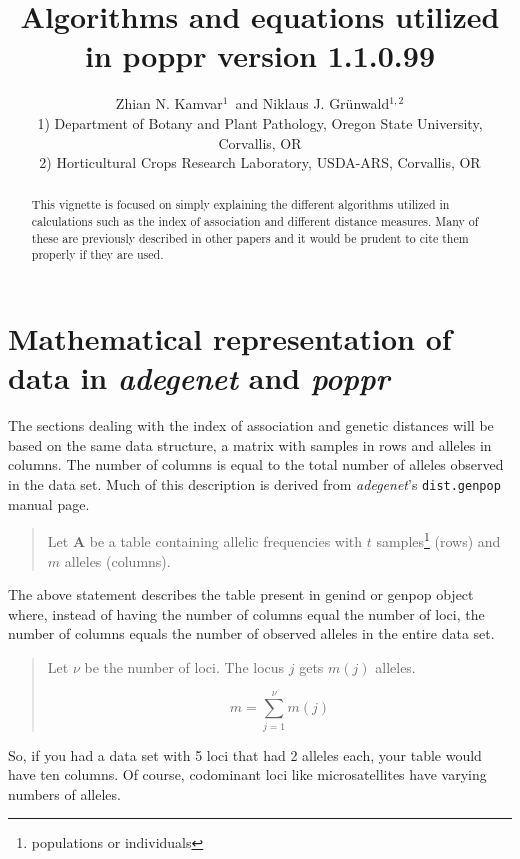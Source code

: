 \documentclass[letterpaper]{article}\usepackage[]{graphicx}\usepackage[]{color}
\title{Algorithms and equations utilized in poppr version 1.1.0.99}
\author{Zhian N. Kamvar$^{1}$\ and Niklaus J. Gr\"unwald$^{1,2}$\\\scriptsize{1)
Department of Botany and Plant Pathology, Oregon State University, Corvallis,
OR}\\\scriptsize{2) Horticultural Crops Research Laboratory, USDA-ARS,
Corvallis, OR}}
\newcommand{\poppr}{\textit{poppr}}
\newcommand{\adegenet}{\textit{adegenet}}
\begin{document}
\maketitle

\begin{abstract}
This vignette is focused on simply explaining the different algorithms utilized
in calculations such as the index of association and different distance measures.
Many of these are previously described in other papers and it would be prudent
to cite them properly if they are used.
\end{abstract}

% 
\begingroup
  \hypersetup{linkcolor=black} 
  \tableofcontents 
\endgroup 

\section{Mathematical representation of data in \adegenet{} and \poppr{}}

The sections dealing with the index of association and genetic distances will be
based on the same data structure, a matrix with samples in rows and alleles in
columns. The number of columns is equal to the total number of alleles observed
in the data set. Much of this description is derived from \adegenet{}'s
\texttt{dist.genpop} manual page.

\begin{quote}
Let \textbf{A} be a table containing allelic frequencies with $t$
samples\footnote{populations or individuals} (rows) and $m$ alleles (columns).\\
\end{quote}
The above statement describes the table present in genind or genpop object
where, instead of having the number of columns equal the number of loci, the
number of columns equals the number of observed alleles in the entire data set.

\begin{quote}
Let $\nu$ be the number of loci. The locus $j$ gets $m(j)$ alleles. 

\begin{equation}
  m=\sum_{j=1}^{\nu} m(j)
\end{equation}
\end{quote}

So, if you had a data set with 5 loci that had 2 alleles each, your table
would have ten columns. Of course, codominant loci like microsatellites have
varying numbers of alleles.
\end{document}
